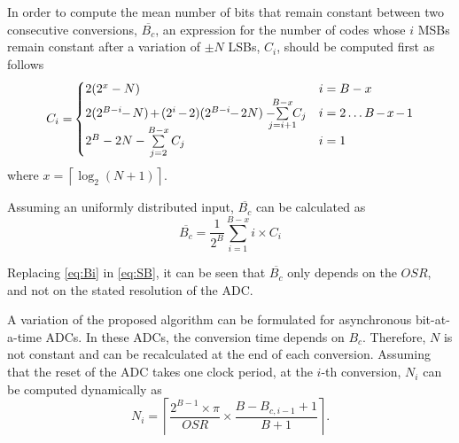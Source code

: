 \documentclass[twocolumn]{el-author}
\begin{document}
In order to compute the mean number of bits that remain constant between two consecutive conversions, $\overline{\mathit{B}_c}$, an expression for the number of codes whose $i$ MSBs remain constant after a variation of $\pm N$ LSBs, $C_i$, should be computed first as follows
\begin{equation}
C_i = \hspace*{-0.1em}
\begin{cases}
2(2^x-N) & i = B-x \\
 2(2^{B-i}\hspace*{-0.3em}-\hspace*{-0.1em}N)\hspace*{-0.1em}+\hspace*{-0.1em}(2^i\hspace*{-0.1em}-\hspace*{-0.1em}2)(2^{B-i}\hspace*{-0.3em}-\hspace*{-0.1em}2N)-\hspace*{-0.8em}  \sum\limits_{j=i+1}^{B-x} \hspace*{-0.5em}C_j & i=2\ldots B\hspace*{-0.1em}-\hspace*{-0.1em}x\hspace*{-0.1em}-\hspace*{-0.1em}1 \vspace*{-4pt}\\
 2^B-2N - \sum\limits_{j=2}^{B-x} C_j  & i=1 \\
\end{cases}\label{eq:Bi}
\end{equation}
where $x = \left\lceil \log_2(N+1)\right\rceil$.

Assuming an uniformly distributed input, $\overline{\mathit{B}_c}$ can be calculated as 
\begin{equation}
\overline{\mathit{B}_c} = \frac{1}{2^B}\sum_{i=1}^{B-x} i \times C_i \label{eq:SB}
\end{equation}

Replacing \eqref{eq:Bi} in \eqref{eq:SB}, it can be seen that $\overline{\mathit{B}_c}$ only depends on the $\mathit{OSR}$, and not on the stated resolution of the ADC.

A variation of the proposed algorithm can be formulated for asynchronous \mbox{bit-at-a-time} ADCs. In these ADCs, the conversion time depends on $\mathit{B}_c$. Therefore, $N$ is not constant and can be recalculated at the end of each conversion. Assuming that the reset of the ADC takes one clock period, at the $i$-th conversion, $N_i$ can be computed dynamically as
\begin{equation}
N_i = \left\lceil \frac{2^{B-1}\times \pi}{\mathit{OSR}} \times \frac{B-\mathit{B}_{c,i-1}+1}{B+1}\right\rceil. \label{eq:Nfinal}
\end{equation} 
\end{document}
